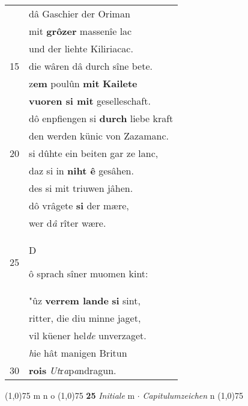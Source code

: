 \documentclass[8pt,a4paper,notitlepage]{article}
\begin{document}
\begin{table}[ht]
\begin{minipage}[t]{0.5\linewidth}
\begin{tabular}{rl}
 & dâ Gaschier der Oriman\\ 
 & mit \textbf{grôzer} massenîe lac\\ 
 & und der liehte Kiliriacac.\\ 
15 & die wâren dâ durch sîne bete.\\ 
 & z\textbf{em} poulûn \textbf{mit} \textbf{Kailete}\\ 
 & \textbf{vuoren si mit} geselleschaft.\\ 
 & dô enpfiengen si \textbf{durch} liebe kraft\\ 
 & den werden künic von Zazamanc.\\ 
20 & si dûhte ein beiten gar ze lanc,\\ 
 & daz si in \textbf{niht ê} gesâhen.\\ 
 & des si mit triuwen jâhen.\\ 
 & dô vrâgete  \textbf{si} der mære,\\ 
 & wer d\textit{â} rîter wære.\\ 
25 & \begin{large}D\end{large}ô sprach sîner muomen kint:\\ 
 & "ûz \textbf{verrem lande} \textbf{si} sint,\\ 
 & ritter, die diu minne jaget,\\ 
 & vil küener hel\textit{de} unverzaget.\\ 
 & \textit{h}ie hât manigen Britun\\ 
30 & \textbf{rois} \textit{Ut}r\textit{a}p\textit{a}ndragun.\\ 
\end{tabular}
\scriptsize
\line(1,0){75} \newline
m n o \newline
\line(1,0){75} \newline
\textbf{25} \textit{Initiale} m   $\cdot$ \textit{Capitulumzeichen} n  \newline
\line(1,0){75} \newline

\end{minipage}
\end{table}
\end{document}
